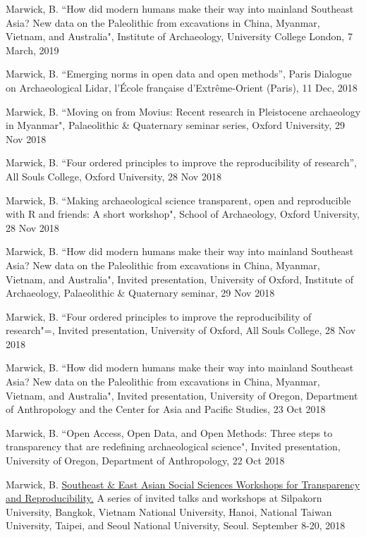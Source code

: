 \ind Marwick, B. ``How did modern humans make their way into mainland Southeast Asia? New data on the Paleolithic from excavations in China, Myanmar, Vietnam, and Australia", Institute of Archaeology, University College London, 7 March, 2019

\ind Marwick, B. ``Emerging norms in open data and open methods”, Paris Dialogue on Archaeological Lidar, l'École française d'Extrême-Orient (Paris), 11 Dec, 2018

\ind Marwick, B. ``Moving on from Movius: Recent research in Pleistocene archaeology in Myanmar", Palaeolithic \& Quaternary seminar series, Oxford University, 29 Nov 2018

\ind Marwick, B. ``Four ordered principles to improve the reproducibility of research”, All Souls College, Oxford University, 28 Nov 2018

\ind Marwick, B. ``Making archaeological science transparent, open and reproducible with R and friends: A short workshop",  School of Archaeology, Oxford University, 28 Nov 2018

\ind Marwick, B. ``How did modern humans make their way into mainland Southeast Asia? New data on the Paleolithic from excavations in China, Myanmar, Vietnam, and Australia", Invited presentation, University of Oxford, Institute of Archaeology, Palaeolithic \& Quaternary seminar, 29 Nov 2018

\ind Marwick, B. ``Four ordered principles to improve the reproducibility of research"=, Invited presentation, University of Oxford, All Souls College, 28 Nov 2018

\ind Marwick, B. ``How did modern humans make their way into mainland Southeast Asia? New data on the Paleolithic from excavations in China, Myanmar, Vietnam, and Australia", Invited presentation, University of Oregon, Department of Anthropology and the Center for Asia and Pacific Studies, 23 Oct 2018

\ind Marwick, B. ``Open Access, Open Data, and Open Methods: Three steps to transparency that are redefining archaeological science", Invited presentation, University of Oregon, Department of Anthropology, 22 Oct 2018

\ind Marwick, B. \href{https://osf.io/ybj43/}{Southeast \& East Asian Social Sciences Workshops for Transparency and Reproducibility.} A series of invited talks and workshops at Silpakorn University, Bangkok, Vietnam National University, Hanoi, National Taiwan University, Taipei, and Seoul National University, Seoul. September 8-20, 2018

